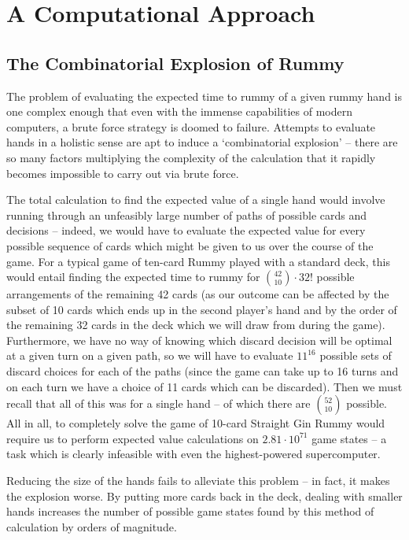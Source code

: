 \documentclass[letter,12pt]{article}
\begin{document}
\section{A Computational Approach}

\subsection{The Combinatorial Explosion of Rummy}

The problem of evaluating the expected time to rummy of a given rummy hand is one complex enough that even with the immense capabilities of modern computers, a brute force strategy is doomed to failure. Attempts to evaluate hands in a holistic sense are apt to induce a ‘combinatorial explosion’ – there are so many factors multiplying the complexity of the calculation that it rapidly becomes impossible to carry out via brute force.

The total calculation to find the expected value of a single hand would involve running through an unfeasibly large number of paths of possible cards and decisions – indeed, we would have to evaluate the expected value for every possible sequence of cards which might be given to us over the course of the game. For a typical game of ten-card Rummy played with a standard deck, this would entail finding the expected time to rummy for $\binom{42}{10}\cdot 32!$ possible arrangements of the remaining 42 cards (as our outcome can be affected by the subset of 10 cards which ends up in the second player's hand and by the order of the remaining 32 cards in the deck which we will draw from during the game). Furthermore, we have no way of knowing which discard decision will be optimal at a given turn on a given path, so we will have to evaluate $11^{16}$ possible sets of discard choices for each of the paths (since the game can take up to 16 turns and on each turn we have a choice of 11 cards which can be discarded). Then we must recall that all of this was for a single hand – of which there are $\binom{52}{10}$ possible. All in all, to completely solve the game of 10-card Straight Gin Rummy would require us to perform expected value calculations on $2.81 \cdot 10^{71}$ game states – a task which is clearly infeasible with even the highest-powered supercomputer.

Reducing the size of the hands fails to alleviate this problem – in fact, it makes the explosion worse. By putting more cards back in the deck, dealing with smaller hands increases the number of possible game states found by this method of calculation by orders of magnitude. 
\end{document}
